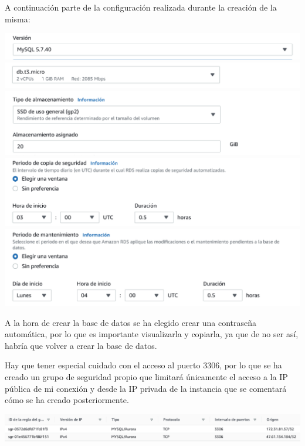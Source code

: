 \documentclass{\ClassPath/viu-tfm-template}
\begin{document}
A continuación parte de la configuración realizada durante la creación de la misma:

\begin{center}
    \includegraphics[width=0.8\linewidth]{img/db1.png}
    \includegraphics[width=0.8\linewidth]{img/db2.png}
    \includegraphics[width=0.8\linewidth]{img/db3.png}
    \includegraphics[width=0.8\linewidth]{img/db4.png}
    \includegraphics[width=0.8\linewidth]{img/db5.png}
\end{center}


A la hora de crear la base de datos se ha elegido crear una contraseña automática, por lo que es importante visualizarla y copiarla, ya que de no ser así, habría que volver a crear la base de datos.


Hay que tener especial cuidado con el acceso al puerto 3306, por lo que se ha creado un grupo de seguridad propio que limitará únicamente el acceso a la IP pública de mi conexión y desde la IP privada de la instancia que se comentará cómo se ha creado posteriormente.

\begin{center}
    \includegraphics[frame,width=\linewidth]{img/db-reglas.png}
\end{center}
\end{document}
